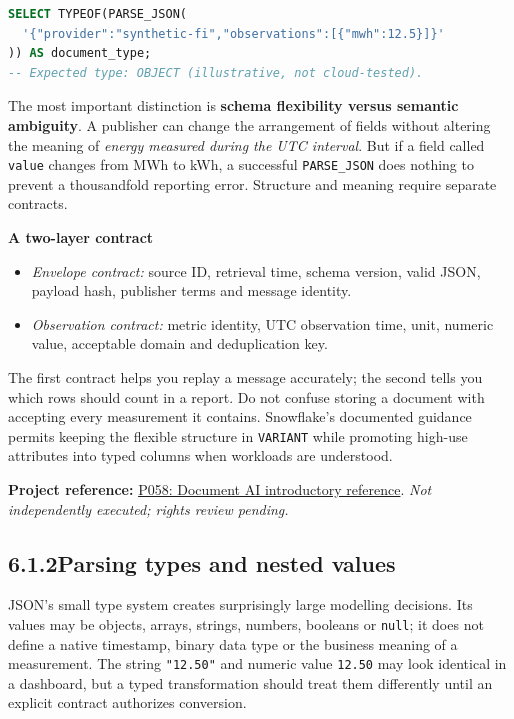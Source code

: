 \documentclass[11pt,twoside]{article}
\newcommand{\topic}[2]{\subsection*{#1\quad #2}}
\newcommand{\repo}[2]{\par\begingroup\fontsize{8.0}{9.6}\selectfont\sffamily\color{inkgray}\textbf{Project reference:} \href{#2}{#1}. \textit{Not independently executed; rights review pending.}\par\endgroup}
\begin{document}
\begin{lstlisting}[language=SQL,caption={Inspect the type after parsing a synthetic API message.}]
SELECT TYPEOF(PARSE_JSON(
  '{"provider":"synthetic-fi","observations":[{"mwh":12.5}]}'
)) AS document_type;
-- Expected type: OBJECT (illustrative, not cloud-tested).
\end{lstlisting}
The most important distinction is \textbf{schema flexibility versus semantic ambiguity}. A publisher can change the arrangement of fields without altering the meaning of \emph{energy measured during the UTC interval}. But if a field called \texttt{value} changes from MWh to kWh, a successful \texttt{PARSE\_JSON} does nothing to prevent a thousandfold reporting error. Structure and meaning require separate contracts.

\begin{whitebox}\textbf{A two-layer contract}
\begin{itemize}
\item \emph{Envelope contract:} source ID, retrieval time, schema version, valid JSON, payload hash, publisher terms and message identity.
\item \emph{Observation contract:} metric identity, UTC observation time, unit, numeric value, acceptable domain and deduplication key.
\end{itemize}\end{whitebox}
The first contract helps you replay a message accurately; the second tells you which rows should count in a report. Do not confuse storing a document with accepting every measurement it contains. Snowflake's documented guidance permits keeping the flexible structure in \texttt{VARIANT} while promoting high-use attributes into typed columns when workloads are understood.
\repo{P058: Document AI introductory reference}{https://github.com/Snowflake-Labs/sfguide-getting-started-with-document-ai}
\newpage
\topic{6.1.2}{Parsing types and nested values}
JSON's small type system creates surprisingly large modelling decisions. Its values may be objects, arrays, strings, numbers, booleans or \texttt{null}; it does not define a native timestamp, binary data type or the business meaning of a measurement. The string \texttt{"12.50"} and numeric value \texttt{12.50} may look identical in a dashboard, but a typed transformation should treat them differently until an explicit contract authorizes conversion.
\end{document}
